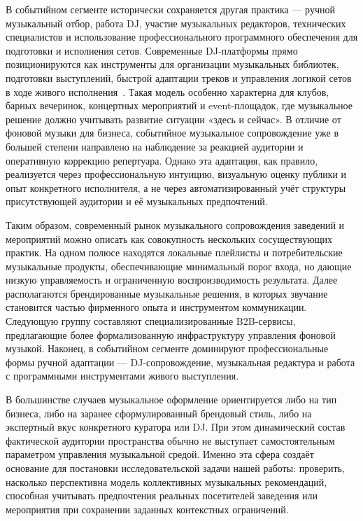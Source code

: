 В событийном сегменте исторически сохраняется другая практика — ручной музыкальный отбор, работа DJ, участие музыкальных редакторов, технических специалистов и использование профессионального программного обеспечения для подготовки и исполнения сетов. Современные DJ-платформы прямо позиционируются как инструменты для организации музыкальных библиотек, подготовки выступлений, быстрой адаптации треков и управления логикой сетов в ходе живого исполнения~\cite{rekordbox_software}. Такая модель особенно характерна для клубов, барных вечеринок, концертных мероприятий и event-площадок, где музыкальное решение должно учитывать развитие ситуации «здесь и сейчас». В отличие от фоновой музыки для бизнеса, событийное музыкальное сопровождение уже в большей степени направлено на наблюдение за реакцией аудитории и оперативную коррекцию репертуара. Однако эта адаптация, как правило, реализуется через профессиональную интуицию, визуальную оценку публики и опыт конкретного исполнителя, а не через автоматизированный учёт структуры присутствующей аудитории и её музыкальных предпочтений.

Таким образом, современный рынок музыкального сопровождения заведений и мероприятий можно описать как совокупность нескольких сосуществующих практик. На одном полюсе находятся локальные плейлисты и потребительские музыкальные продукты, обеспечивающие минимальный порог входа, но дающие низкую управляемость и ограниченную воспроизводимость результата. Далее располагаются брендированные музыкальные решения, в которых звучание становится частью фирменного опыта и инструментом коммуникации. Следующую группу составляют специализированные B2B-сервисы, предлагающие более формализованную инфраструктуру управления фоновой музыкой. Наконец, в событийном сегменте доминируют профессиональные формы ручной адаптации — DJ-сопровождение, музыкальная редактура и работа с программными инструментами живого выступления.

В большинстве случаев музыкальное оформление ориентируется либо на тип бизнеса, либо на заранее сформулированный брендовый стиль, либо на экспертный вкус конкретного куратора или DJ. При этом динамический состав фактической аудитории пространства обычно не выступает самостоятельным параметром управления музыкальной средой. Именно эта сфера создаёт основание для постановки исследовательской задачи нашей работы: проверить, насколько перспективна модель коллективных музыкальных рекомендаций, способная учитывать предпочтения реальных посетителей заведения или мероприятия при сохранении заданных контекстных ограничений.

